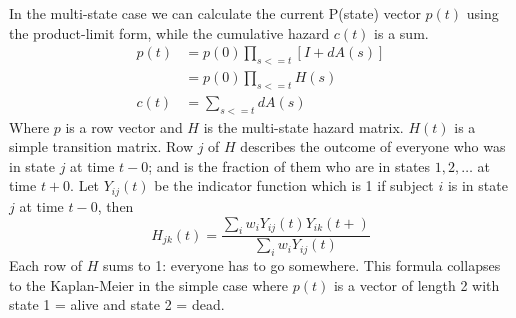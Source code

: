 \documentclass{article}
\begin{document}
In the multi-state case we can calculate the current P(state)
vector $p(t)$ using the product-limit form, while the cumulative hazard
$c(t)$ is a sum.
\begin{align*}
    p(t) &= p(0)\prod_{s<=t} [I + dA(s)] \\
         &= p(0) \prod_{s<=t} H(s) \\
    c(t) &= \sum_{s<=t} dA(s)
\end{align*}
Where $p$ is a row vector and $H$ is the multi-state hazard matrix.  
$H(t)$ is a simple transition matrix.  
Row $j$ of $H$ describes the outcome of everyone who was in state $j$ at
time $t-0$; and is the fraction of them who are in states $1, 2, \ldots$
at time $t+0$.  
Let $Y_{ij}(t)$ be the indicator function which is 1 if subject $i$
is in state $j$ at time $t-0$, then
\begin{equation}
  H_{jk}(t) = \frac{\sum_i w_i Y_{ij}(t) Y_{ik}(t+)}
                  {\sum_i w_i Y_{ij}(t)} \label{H}
\end{equation}
Each row of $H$ sums to 1: everyone has to go somewhere. 
This formula collapses to the Kaplan-Meier in the simple case where $p(t)$ is a
vector of length 2 with state 1 = alive and state 2 = dead. 
\end{document}

